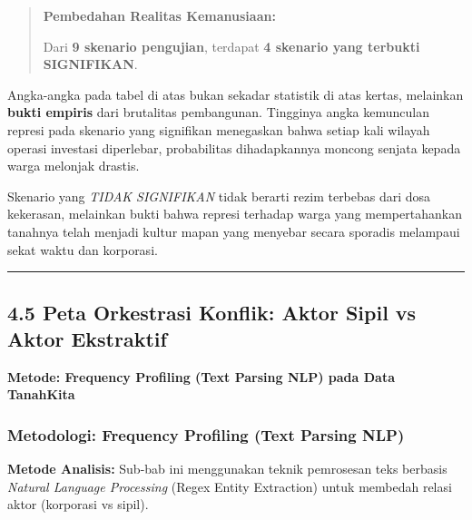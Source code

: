 \documentclass[
]{article}
\begin{document}
\begin{quote}
\textbf{Pembedahan Realitas Kemanusiaan:}

Dari \textbf{9 skenario pengujian}, terdapat \textbf{4 skenario yang
terbukti SIGNIFIKAN}.
\end{quote}

Angka-angka pada tabel di atas bukan sekadar statistik di atas kertas,
melainkan \textbf{bukti empiris} dari brutalitas pembangunan. Tingginya
angka kemunculan represi pada skenario yang signifikan menegaskan bahwa
setiap kali wilayah operasi investasi diperlebar, probabilitas
dihadapkannya moncong senjata kepada warga melonjak drastis.

Skenario yang \emph{TIDAK SIGNIFIKAN} tidak berarti rezim terbebas dari
dosa kekerasan, melainkan bukti bahwa represi terhadap warga yang
mempertahankan tanahnya telah menjadi kultur mapan yang menyebar secara
sporadis melampaui sekat waktu dan korporasi.

\begin{center}\rule{0.5\linewidth}{0.5pt}\end{center}

\subsection{4.5 Peta Orkestrasi Konflik: Aktor Sipil vs Aktor
Ekstraktif}\label{peta-orkestrasi-konflik-aktor-sipil-vs-aktor-ekstraktif}

\textbf{Metode: Frequency Profiling (Text Parsing NLP) pada Data
TanahKita}

\subsubsection{Metodologi: Frequency Profiling (Text Parsing
NLP)}\label{metodologi-frequency-profiling-text-parsing-nlp}

\textbf{Metode Analisis:} Sub-bab ini menggunakan teknik pemrosesan teks
berbasis \emph{Natural Language Processing} (Regex Entity Extraction)
untuk membedah relasi aktor (korporasi vs sipil).
\end{document}
